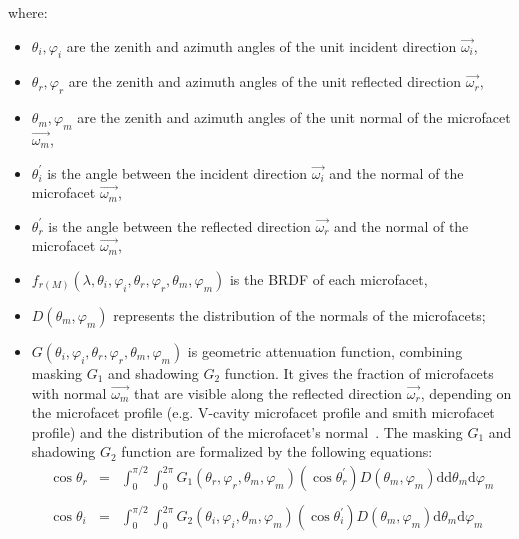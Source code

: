 where:
\begin{itemize}
    \item $\theta_i, \varphi_i$ are the zenith and azimuth angles of the unit incident direction $\overrightarrow{\omega_i}$,

    \item $\theta_r, \varphi_r$ are the zenith and azimuth angles of the unit reflected direction $\overrightarrow{\omega_r}$,

    \item $\theta_m, \varphi_m$ are the zenith and azimuth angles of the unit normal of the microfacet $\overrightarrow{\omega_m}$,

    \item $\theta_i^\prime$ is the angle between the incident direction $\overrightarrow{\omega_i}$ and the normal of the microfacet $\overrightarrow{\omega_m}$,

    \item $\theta_r^\prime$ is the angle between the reflected direction $\overrightarrow{\omega_r}$ and the normal of the microfacet $\overrightarrow{\omega_m}$,

    \item $f_{r(M)}(\lambda, \theta_i, \varphi_i, \theta_r, \varphi_r, \theta_m, \varphi_m)$ is the BRDF of each microfacet,

    \item $D(\theta_m, \varphi_m)$ represents the distribution of the normals of the microfacets;

    \item $G(\theta_i, \varphi_i, \theta_r, \varphi_r, \theta_m, \varphi_m)$ is geometric attenuation function, combining masking $G_1$ and shadowing $G_2$ function.
          It gives the fraction of microfacets with normal $\overrightarrow{\omega_m}$ that are visible along the reflected direction $\overrightarrow{\omega_r}$, depending on the microfacet profile (e.g. V-cavity microfacet profile and smith microfacet profile) and the distribution of the microfacet's normal~\cite{2014_Heitz}.
          The masking $G_1$ and shadowing $G_2$ function are formalized by the following equations:
          \begin{equation}
              \begin{array}{lll}
                  \label{eq_masking_shadowing}
                  \cos\theta_r & = & \displaystyle{
                      \int_{0}^{\pi/2} \int_{0}^{2\pi}%
                      G_1(\theta_r, \varphi_r, \theta_m, \varphi_m) %
                      (\cos\theta_r^\prime)%
                      D(\theta_m, \varphi_m) \mathrm{d} \mathrm{d} \theta_m \mathrm{d} \varphi_m%
                  }                                                                 \\ \\
                  \cos\theta_i & = & \displaystyle{\int_{0}^{\pi/2} \int_{0}^{2\pi} %
                      G_2(\theta_i, \varphi_i, \theta_m, \varphi_m)%
                      (\cos\theta_i^\prime)%
                      D(\theta_m, \varphi_m) \mathrm{d} \theta_m \mathrm{d} \varphi_m}
              \end{array}
          \end{equation}


\end{itemize}
